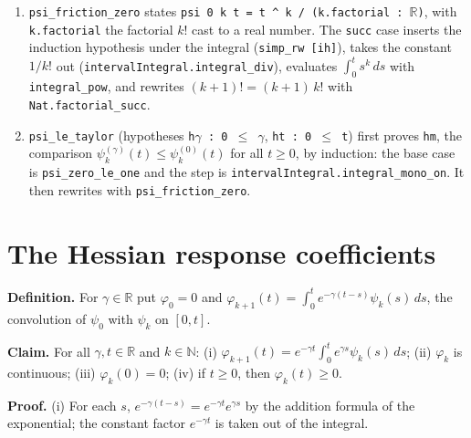 \documentclass[11pt,a4paper]{article}
\begin{document}
\begin{leanbox}
\begin{enumerate}
\item \texttt{psi\_\allowbreak{}friction\_\allowbreak{}zero} states \texttt{psi 0 k t = t \textasciicircum{} k /\allowbreak{} (k.\allowbreak{}factorial : \ensuremath{\mathbb R})}, with \texttt{k.\allowbreak{}factorial} the factorial \(k!\) cast to a real number. The \texttt{succ} case inserts the induction hypothesis under the integral (\texttt{simp\_\allowbreak{}rw [ih]}), takes the constant \(1/k!\) out (\texttt{interval\allowbreak{}Integral.\allowbreak{}integral\_\allowbreak{}div}), evaluates \(\int_0^ts^k\,ds\) with \texttt{integral\_\allowbreak{}pow}, and rewrites \((k+1)!=(k+1)\,k!\) with \texttt{Nat.\allowbreak{}factorial\_\allowbreak{}succ}.

\item \texttt{psi\_\allowbreak{}le\_\allowbreak{}taylor} (hypotheses \texttt{h\ensuremath{\gamma} : 0 \ensuremath{\le} \ensuremath{\gamma}}, \texttt{ht : 0 \ensuremath{\le} t}) first proves \texttt{hm}, the comparison \(\psi_k^{(\gamma)}(t)\le\psi_k^{(0)}(t)\) for all \(t\ge0\), by induction: the base case is \texttt{psi\_\allowbreak{}zero\_\allowbreak{}le\_\allowbreak{}one} and the step is \texttt{interval\allowbreak{}Integral.\allowbreak{}integral\_\allowbreak{}mono\_\allowbreak{}on}. It then rewrites with \texttt{psi\_\allowbreak{}friction\_\allowbreak{}zero}.

\end{enumerate}
\end{leanbox}

\section{\texorpdfstring{The Hessian response coefficients}{The Hessian response coefficients}}


\textbf{Definition.} For \(\gamma\in\mathbb R\) put \(\varphi_0=0\) and \(\varphi_{k+1}(t)=\int_0^te^{-\gamma(t-s)}\psi_k(s)\,ds\), the convolution of \(\psi_0\) with \(\psi_k\) on \([0,t]\).




\textbf{Claim.} For all \(\gamma,t\in\mathbb R\) and \(k\in\mathbb N\):
(i) \(\varphi_{k+1}(t)=e^{-\gamma t}\int_0^te^{\gamma s}\psi_k(s)\,ds\);
(ii) \(\varphi_k\) is continuous;
(iii) \(\varphi_k(0)=0\);
(iv) if \(t\ge0\), then \(\varphi_k(t)\ge0\).




\textbf{Proof.} (i) For each \(s\), \(e^{-\gamma(t-s)}=e^{-\gamma t}e^{\gamma s}\) by the addition formula of the exponential; the constant factor \(e^{-\gamma t}\) is taken out of the integral.
\end{document}

